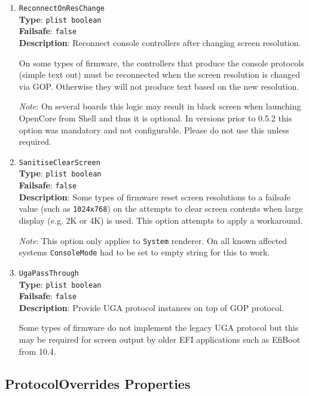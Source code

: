 \documentclass[]{article}
\begin{document}
\begin{enumerate}
\item
  \texttt{ReconnectOnResChange}\\
  \textbf{Type}: \texttt{plist\ boolean}\\
  \textbf{Failsafe}: \texttt{false}\\
  \textbf{Description}: Reconnect console controllers after changing screen resolution.

  On some types of firmware, the controllers that produce the console protocols
  (simple text out) must be reconnected when the screen resolution is changed via GOP.
  Otherwise they will not produce text based on the new resolution.

  \emph{Note}: On several boards this logic may result in black screen when launching
  OpenCore from Shell and thus it is optional. In versions prior to 0.5.2 this option
  was mandatory and not configurable. Please do not use this unless required.

\item
  \texttt{SanitiseClearScreen}\\
  \textbf{Type}: \texttt{plist\ boolean}\\
  \textbf{Failsafe}: \texttt{false}\\
  \textbf{Description}: Some types of firmware reset screen resolutions to a failsafe
  value (such as \texttt{1024x768}) on the attempts to clear screen contents
  when large display (e.g. 2K or 4K) is used. This option attempts to apply
  a workaround.

  \emph{Note}: This option only applies to \texttt{System} renderer.
   On all known affected systems \texttt{ConsoleMode} had to be set to
   empty string for this to work.

\item
  \texttt{UgaPassThrough}\\
  \textbf{Type}: \texttt{plist\ boolean}\\
  \textbf{Failsafe}: \texttt{false}\\
  \textbf{Description}: Provide UGA protocol instances on top of GOP protocol.

  Some types of firmware do not implement the legacy UGA protocol but this may be required
  for screen output by older EFI applications such as EfiBoot from 10.4.

\end{enumerate}


\subsection{ProtocolOverrides Properties}\label{uefiprotoprops}
\end{document}
